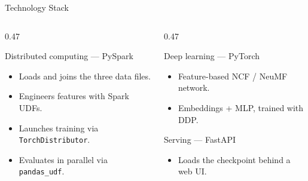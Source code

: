 \documentclass[aspectratio=169]{beamer}
\begin{document}
\begin{frame}{Technology Stack}
\begin{columns}[T,onlytextwidth]
  \begin{column}{0.47\textwidth}
    \begin{block}{Distributed computing --- PySpark}
    \begin{itemize}
      \item Loads and joins the three data files.
      \item Engineers features with Spark UDFs.
      \item Launches training via \texttt{TorchDistributor}.
      \item Evaluates in parallel via \texttt{pandas\_udf}.
    \end{itemize}
    \end{block}
  \end{column}
  \hfill
  \begin{column}{0.47\textwidth}
    \begin{block}{Deep learning --- PyTorch}
    \begin{itemize}
      \item Feature-based NCF / NeuMF network.
      \item Embeddings + MLP, trained with DDP.
    \end{itemize}
    \end{block}
    \begin{block}{Serving --- FastAPI}
    \begin{itemize}
      \item Loads the checkpoint behind a web UI.
    \end{itemize}
    \end{block}
  \end{column}
\end{columns}

\vspace{0.2cm}
\end{frame}
\end{document}
